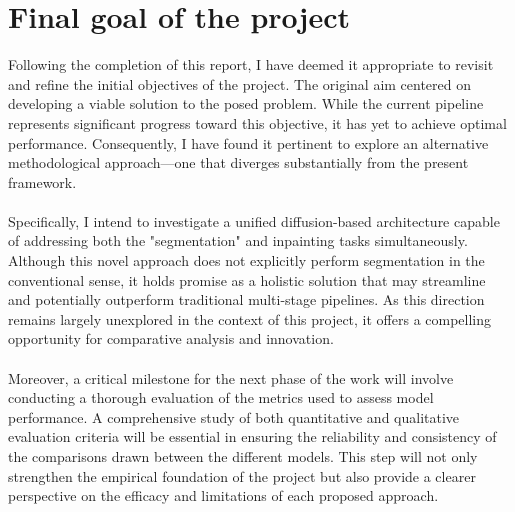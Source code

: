 \documentclass[openany, 12pt]{article}
\begin{document}
	\section{Final goal of the project}
Following the completion of this report, I have deemed it appropriate to revisit and refine the initial objectives of the project. The original aim centered on developing a viable solution to the posed problem. While the current pipeline represents significant progress toward this objective, it has yet to achieve optimal performance. Consequently, I have found it pertinent to explore an alternative methodological approach—one that diverges substantially from the present framework.\\
\\Specifically, I intend to investigate a unified diffusion-based architecture capable of addressing both the "segmentation" and inpainting tasks simultaneously. Although this novel approach does not explicitly perform segmentation in the conventional sense, it holds promise as a holistic solution that may streamline and potentially outperform traditional multi-stage pipelines. As this direction remains largely unexplored in the context of this project, it offers a compelling opportunity for comparative analysis and innovation.\\
\\
Moreover, a critical milestone for the next phase of the work will involve conducting a thorough evaluation of the metrics used to assess model performance. A comprehensive study of both quantitative and qualitative evaluation criteria will be essential in ensuring the reliability and consistency of the comparisons drawn between the different models. This step will not only strengthen the empirical foundation of the project but also provide a clearer perspective on the efficacy and limitations of each proposed approach.\clearpage
	\newpage
	{}
	\nocite{kaji_overview_2019}
	\nocite{leejunhyun_leejunhyunimage_segmentation_2025}
	\nocite{zhu_denoising_2023}
	\nocite{xie_star_2025}
	\nocite{xie_segformer_2021}
	
	
	
\end{document}
